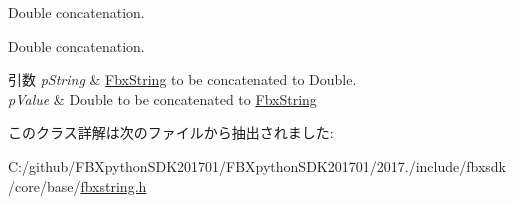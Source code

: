 Double concatenation. 

Double concatenation. 
\begin{DoxyParams}{引数}
{\em p\+String} & \hyperlink{class_fbx_string}{Fbx\+String} to be concatenated to Double. \\
\hline
{\em p\+Value} & Double to be concatenated to \hyperlink{class_fbx_string}{Fbx\+String} \\
\hline
\end{DoxyParams}


このクラス詳解は次のファイルから抽出されました\+:\begin{DoxyCompactItemize}
\item 
C\+:/github/\+F\+B\+Xpython\+S\+D\+K201701/\+F\+B\+Xpython\+S\+D\+K201701/2017./include/fbxsdk/core/base/\hyperlink{fbxstring_8h}{fbxstring.\+h}\end{DoxyCompactItemize}
